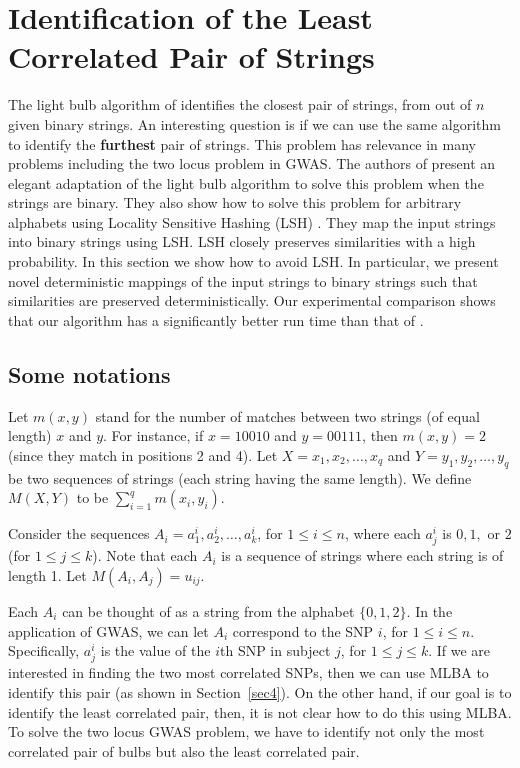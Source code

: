 \documentclass{article}
\theoremstyle{definition}
\theoremstyle{remark}
\begin{document}
\section{Identification of the Least Correlated Pair of Strings}\label{sec5}
The light bulb algorithm of \cite{RSJ89} identifies the closest pair of strings, from out of $n$ given binary strings. An interesting question is if we can use the same algorithm to identify the {\bf furthest} pair of strings. This problem has relevance in many problems including the two locus problem in GWAS.
The authors of \cite{PBK11} present an elegant adaptation of the light bulb algorithm to solve this problem when the strings are binary. They also show how to solve this problem for arbitrary alphabets using Locality Sensitive Hashing (LSH) \cite{M02}. They map the input strings into binary strings using LSH. LSH closely preserves similarities with a high probability. In this section we show how to avoid LSH. In particular, we present novel deterministic mappings of the input strings to binary strings such that similarities are preserved deterministically.  Our experimental comparison shows that our algorithm has a  significantly better run time than that of \cite{PBK11}.


\subsection{Some notations}
 Let $m(x,y)$ stand for the number of matches between two strings (of equal length) $x$ and $y$. For instance, if $x=10010$ and $y=00111$, then $m(x,y)=2$ (since they match in positions 2 and 4). Let $X=x_1,x_2,\ldots,x_q$ and $Y=y_1,y_2,\ldots,y_q$ be two sequences of strings (each string having the same length). We define $M(X,Y)$ to be $\sum_{i=1}^qm(x_i,y_i)$.

   Consider the sequences $A_i=a_1^i,a_2^i,\ldots,a_k^i$, for $1\leq i\leq n$, where each $a_j^i$ is $0,1,$ or $2$ (for $1\leq j\leq k$). Note that each $A_i$ is a sequence of strings where each string is of length 1. Let $M(A_i,A_j)=u_{ij}$.

Each $A_i$ can be thought of as a string from the alphabet $\{0,1,2\}$. In the application of GWAS, we can let $A_i$ correspond to the SNP $i$, for $1\leq i\leq n$. Specifically, $a_j^i$ is the value of the $i$th SNP in subject $j$, for $1\leq j\leq k$. If we are interested in finding the two most correlated SNPs, then we can use MLBA to identify this pair (as shown in Section~\ref{sec4}). On the other hand, if our goal is to identify the least correlated pair, then, it is not clear how to do this using MLBA. To solve the two locus GWAS problem, we have to identify not only the most correlated pair of bulbs but also the least correlated pair.
\end{document}
